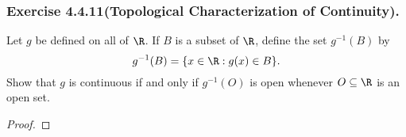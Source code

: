 \subsubsection{Exercise 4.4.11(Topological Characterization of Continuity).} Let \( g  \) be defined on all of \( \R  \). If \( B  \) is a subset of \( \R  \), define the set \( g^{-1}(B)  \) by 
\[  g^{-1}(B) = \{ x \in \R : g(x) \in B  \}. \]
Show that \( g  \) is continuous if and only if \( g^{-1}(O)  \) is open whenever \( O \subseteq \R  \) is an open set.
\begin{proof}

\end{proof}


